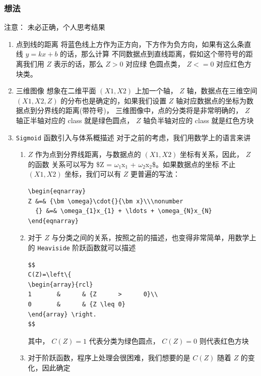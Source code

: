 \documentclass[11pt]{ctexart}
\newcommand{\bm}[1]{\mbox{\boldmath{$#1$}}}
\begin{document}
\subsubsection{想法}
\label{sec:orgheadline55}
注意： 未必正确，个人思考结果
\begin{enumerate}
\item 点到线的距离
\label{sec:orgheadline48}
将蓝色线上方作为正方向，下方作为负方向，如果有这么条直线 \(y=kx+b\) 的话，那么计算
不同数据点到直线距离，假如这个带符号的距离我们用 \(Z\) 表示的话，那么 \(Z>0\) 对应绿
色圆点类， \(Z <= 0\) 对应红色方块类。
\item 三维图像
\label{sec:orgheadline49}
想象在二维平面 \((X1, X2)\) 上加一个轴， \(Z\) 轴，数据点在三维空间 \((X1, X2, Z)\)
的分布也是确定的，如果我们设置 \(Z\) 轴对应数据点的坐标为数据点到分界线的距离(带符号)，
三维图像中，点的分类将是非常明确的， \(Z\) 轴正半轴对应的 class 就是绿色圆点， \(Z\)
轴负半轴对应的 class 就是红色方块
\item \texttt{Sigmoid} 函数引入与体系概描述
\label{sec:orgheadline50}
对于之前的考虑，我们用数学上的语言来讲
\begin{enumerate}
\item \(Z\) 作为点到分界线距离，与数据点的 \((X1, X2)\) 坐标有关系，因此， \(Z\) 的函数
关系可以写为 \$Z = \(\omega_{\text{1}}\)x\(_{\text{1}}\) + \(\omega_{\text{2}}\)x\(_{\text{2}}\)\$。如果数据点的坐标
不止 \((X1, X2)\) 坐标，我们可以有 \(Z\) 更普遍的写法：
\lstset{language=[LaTeX]TeX,label= ,caption= ,captionpos=b,numbers=none}
\begin{lstlisting}
\begin{eqnarray}
Z &=& {\bm \omega}\cdot{}{\bm x}\\\nonumber
  {} &=& \omega_{1}x_{1} + \ldots + \omega_{N}x_{N}
\end{eqnarray}
\end{lstlisting}
\item 对于 \(Z\) 与分类之间的关系，按照之前的描述，也变得非常简单，用数学上的 \texttt{Heaviside}
   阶跃函数就可以描述
\lstset{language=[LaTeX]TeX,label= ,caption= ,captionpos=b,numbers=none}
\begin{lstlisting}
$$
C(Z)=\left\{
\begin{array}{rcl}
1       &      & {Z      >      0}\\
0       &      & {Z \leq 0}
\end{array} \right. 
$$
\end{lstlisting}
其中， \(C(Z) =1\) 代表分类为绿色圆点， \(C(Z)=0\) 则代表红色方块
\item 对于阶跃函数，程序上处理会很困难，我们想要的是 \(C(Z)\) 随着 \(Z\) 的变化，因此确定 

\end{enumerate}
\end{enumerate}
\end{document}
